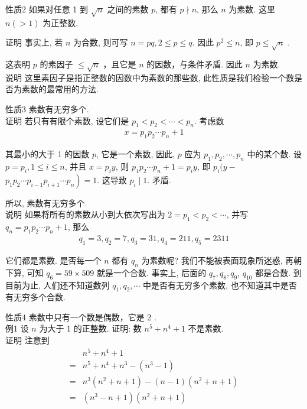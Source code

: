 性质2 如果对任意 1 到 $\sqrt{n}$ 之间的素数 $p$, 都有 $p \nmid n$, 那么 $n$ 为素数. 这里 $n(>1)$ 为正整数.

证明 事实上, 若 $n$ 为合数, 则可写 $n=p q, 2 \leqslant p \leqslant q$. 因此 $p^{2} \leqslant n$, 即 $p \leqslant \sqrt{n}$ . 

这表明 $p$ 的素因子 $\leqslant \sqrt{n}$ ，且它是 $n$ 的因数，与条件矛盾. 因此 $n$ 为素数.\\
说明 这里素因子是指正整数的因数中为素数的那些数, 此性质是我们检验一个数是否为素数的最常用的方法. 

性质3 素数有无穷多个.\\
证明 若只有有限个素数, 设它们是 $p_{1}<p_{2}<\cdots<p_{n}$. 考虑数\\
\begin{align*}
x=p_{1} p_{2} \cdots p_{n}+1
\end{align*}

其最小的大于 1 的因数 $p$, 它是一个素数, 因此, $p$ 应为 $p_{1}, p_{2}, \cdots, p_{n}$ 中的某个数. 设 $p=p_{i}, 1 \leqslant i \leqslant n$, 并且 $x=p_{i} y$, 则 $p_{1} p_{2} \cdots p_{n}+1=p_{i} y$, 即 $p_{i}(y-$ $\left.p_{1} p_{2} \cdots p_{i-1} p_{i+1} \cdots p_{n}\right)=1$. 这导致 $p_{i} \mid 1$. 矛盾.

所以, 素数有无穷多个.\\
说明 如果将所有的素数从小到大依次写出为 $2=p_{1}<p_{2}<\cdots$, 并写 $q_{n}=p_{1} p_{2} \cdots p_{n}+1$, 那么\\
\begin{align*}
q_{1}=3, q_{2}=7, q_{3}=31, q_{4}=211, q_{5}=2311
\end{align*}

它们都是素数. 是否每一个 $n$ 都有 $q_{n}$ 为素数呢? 我们不能被表面现象所迷惑, 再朝下算, 可知 $q_{6}=59 \times 509$ 就是一个合数. 事实上, 后面的 $q_{7}, q_{8}, q_{9}$, $q_{10}$ 都是合数. 到目前为止, 人们还不知道数列 $q_{1}, q_{2}, \cdots$ 中是否有无穷多个素数, 也不知道其中是否有无穷多个合数.

性质4 素数中只有一个数是偶数，它是 2 . \\
例1 设 $n$ 为大于 1 的正整数. 证明: 数 $n^{5}+n^{4}+1$ 不是素数.\\
证明 注意到\\
\begin{align}
& n^{5}+n^{4}+1 \\
= & n^{5}+n^{4}+n^{3}-\left(n^{3}-1\right) \\
= & n^{3}\left(n^{2}+n+1\right)-(n-1)\left(n^{2}+n+1\right) \\
= & \left(n^{3}-n+1\right)\left(n^{2}+n+1\right)
\end{align}

